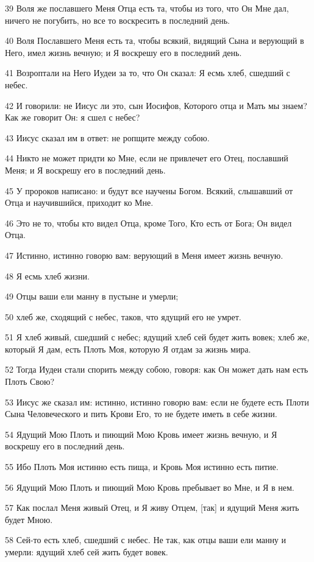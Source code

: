 \par 39 Воля же пославшего Меня Отца есть та, чтобы из того, что Он Мне дал, ничего не погубить, но все то воскресить в последний день.
\par 40 Воля Пославшего Меня есть та, чтобы всякий, видящий Сына и верующий в Него, имел жизнь вечную; и Я воскрешу его в последний день.
\par 41 Возроптали на Него Иудеи за то, что Он сказал: Я есмь хлеб, сшедший с небес.
\par 42 И говорили: не Иисус ли это, сын Иосифов, Которого отца и Мать мы знаем? Как же говорит Он: я сшел с небес?
\par 43 Иисус сказал им в ответ: не ропщите между собою.
\par 44 Никто не может придти ко Мне, если не привлечет его Отец, пославший Меня; и Я воскрешу его в последний день.
\par 45 У пророков написано: и будут все научены Богом. Всякий, слышавший от Отца и научившийся, приходит ко Мне.
\par 46 Это не то, чтобы кто видел Отца, кроме Того, Кто есть от Бога; Он видел Отца.
\par 47 Истинно, истинно говорю вам: верующий в Меня имеет жизнь вечную.
\par 48 Я есмь хлеб жизни.
\par 49 Отцы ваши ели манну в пустыне и умерли;
\par 50 хлеб же, сходящий с небес, таков, что ядущий его не умрет.
\par 51 Я хлеб живый, сшедший с небес; ядущий хлеб сей будет жить вовек; хлеб же, который Я дам, есть Плоть Моя, которую Я отдам за жизнь мира.
\par 52 Тогда Иудеи стали спорить между собою, говоря: как Он может дать нам есть Плоть Свою?
\par 53 Иисус же сказал им: истинно, истинно говорю вам: если не будете есть Плоти Сына Человеческого и пить Крови Его, то не будете иметь в себе жизни.
\par 54 Ядущий Мою Плоть и пиющий Мою Кровь имеет жизнь вечную, и Я воскрешу его в последний день.
\par 55 Ибо Плоть Моя истинно есть пища, и Кровь Моя истинно есть питие.
\par 56 Ядущий Мою Плоть и пиющий Мою Кровь пребывает во Мне, и Я в нем.
\par 57 Как послал Меня живый Отец, и Я живу Отцем, [так] и ядущий Меня жить будет Мною.
\par 58 Сей-то есть хлеб, сшедший с небес. Не так, как отцы ваши ели манну и умерли: ядущий хлеб сей жить будет вовек.
